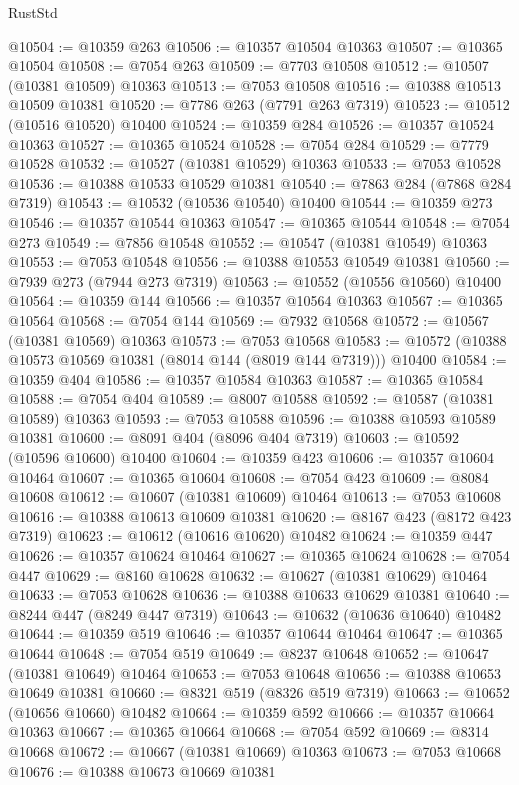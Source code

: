 \begin{lexlean}{RustStd}
\begin{coremodule}
@10504 := @10359 @263
@10506 := @10357 @10504 @10363
@10507 := @10365 @10504
@10508 := @7054 @263
@10509 := @7703 @10508
@10512 := @10507 (@10381 @10509) @10363
@10513 := @7053 @10508
@10516 := @10388 @10513 @10509 @10381
@10520 := @7786 @263 (@7791 @263 @7319)
@10523 := @10512 (@10516 @10520) @10400
@10524 := @10359 @284
@10526 := @10357 @10524 @10363
@10527 := @10365 @10524
@10528 := @7054 @284
@10529 := @7779 @10528
@10532 := @10527 (@10381 @10529) @10363
@10533 := @7053 @10528
@10536 := @10388 @10533 @10529 @10381
@10540 := @7863 @284 (@7868 @284 @7319)
@10543 := @10532 (@10536 @10540) @10400
@10544 := @10359 @273
@10546 := @10357 @10544 @10363
@10547 := @10365 @10544
@10548 := @7054 @273
@10549 := @7856 @10548
@10552 := @10547 (@10381 @10549) @10363
@10553 := @7053 @10548
@10556 := @10388 @10553 @10549 @10381
@10560 := @7939 @273 (@7944 @273 @7319)
@10563 := @10552 (@10556 @10560) @10400
@10564 := @10359 @144
@10566 := @10357 @10564 @10363
@10567 := @10365 @10564
@10568 := @7054 @144
@10569 := @7932 @10568
@10572 := @10567 (@10381 @10569) @10363
@10573 := @7053 @10568
@10583 := @10572 (@10388 @10573 @10569 @10381 (@8014 @144 (@8019 @144 @7319))) @10400
@10584 := @10359 @404
@10586 := @10357 @10584 @10363
@10587 := @10365 @10584
@10588 := @7054 @404
@10589 := @8007 @10588
@10592 := @10587 (@10381 @10589) @10363
@10593 := @7053 @10588
@10596 := @10388 @10593 @10589 @10381
@10600 := @8091 @404 (@8096 @404 @7319)
@10603 := @10592 (@10596 @10600) @10400
@10604 := @10359 @423
@10606 := @10357 @10604 @10464
@10607 := @10365 @10604
@10608 := @7054 @423
@10609 := @8084 @10608
@10612 := @10607 (@10381 @10609) @10464
@10613 := @7053 @10608
@10616 := @10388 @10613 @10609 @10381
@10620 := @8167 @423 (@8172 @423 @7319)
@10623 := @10612 (@10616 @10620) @10482
@10624 := @10359 @447
@10626 := @10357 @10624 @10464
@10627 := @10365 @10624
@10628 := @7054 @447
@10629 := @8160 @10628
@10632 := @10627 (@10381 @10629) @10464
@10633 := @7053 @10628
@10636 := @10388 @10633 @10629 @10381
@10640 := @8244 @447 (@8249 @447 @7319)
@10643 := @10632 (@10636 @10640) @10482
@10644 := @10359 @519
@10646 := @10357 @10644 @10464
@10647 := @10365 @10644
@10648 := @7054 @519
@10649 := @8237 @10648
@10652 := @10647 (@10381 @10649) @10464
@10653 := @7053 @10648
@10656 := @10388 @10653 @10649 @10381
@10660 := @8321 @519 (@8326 @519 @7319)
@10663 := @10652 (@10656 @10660) @10482
@10664 := @10359 @592
@10666 := @10357 @10664 @10363
@10667 := @10365 @10664
@10668 := @7054 @592
@10669 := @8314 @10668
@10672 := @10667 (@10381 @10669) @10363
@10673 := @7053 @10668
@10676 := @10388 @10673 @10669 @10381

\end{coremodule}
\end{lexlean}
